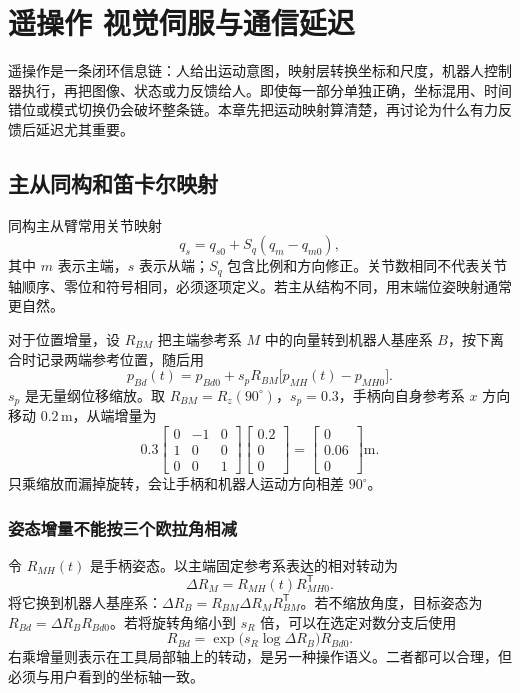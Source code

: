 \chapter{遥操作 视觉伺服与通信延迟}
\label{ch:teleoperation}

遥操作是一条闭环信息链：人给出运动意图，映射层转换坐标和尺度，机器人控制器执行，再把图像、状态或力反馈给人。即使每一部分单独正确，坐标混用、时间错位或模式切换仍会破坏整条链。本章先把运动映射算清楚，再讨论为什么有力反馈后延迟尤其重要。

\section{主从同构和笛卡尔映射}

同构主从臂常用关节映射
\begin{equation}
q_s=q_{s0}+S_q(q_m-q_{m0}),
\end{equation}
其中 $m$ 表示主端，$s$ 表示从端；$S_q$ 包含比例和方向修正。关节数相同不代表关节轴顺序、零位和符号相同，必须逐项定义。若主从结构不同，用末端位姿映射通常更自然。

对于位置增量，设 $R_{BM}$ 把主端参考系 $M$ 中的向量转到机器人基座系 $B$，按下离合时记录两端参考位置，随后用
\begin{equation}
p_{Bd}(t)=p_{Bd0}+s_pR_{BM}\big[p_{MH}(t)-p_{MH0}\big].
\end{equation}
$s_p$ 是无量纲位移缩放。取 $R_{BM}=R_z(90^\circ)$，$s_p=0.3$，手柄向自身参考系 $x$ 方向移动 $0.2\,\mathrm m$，从端增量为
\[
0.3\begin{bmatrix}0&-1&0\\1&0&0\\0&0&1\end{bmatrix}
\begin{bmatrix}0.2\\0\\0\end{bmatrix}
=\begin{bmatrix}0\\0.06\\0\end{bmatrix}\mathrm m.
\]
只乘缩放而漏掉旋转，会让手柄和机器人运动方向相差 $90^\circ$。

\subsection{姿态增量不能按三个欧拉角相减}

令 $R_{MH}(t)$ 是手柄姿态。以主端固定参考系表达的相对转动为
\begin{equation}
\Delta R_M=R_{MH}(t)R_{MH0}^{\mathsf T}.
\end{equation}
将它换到机器人基座系：$\Delta R_B=R_{BM}\Delta R_MR_{BM}^{\mathsf T}$。若不缩放角度，目标姿态为 $R_{Bd}=\Delta R_BR_{Bd0}$。若将旋转角缩小到 $s_R$ 倍，可以在选定对数分支后使用
\begin{equation}
R_{Bd}=\exp\!\big(s_R\log\Delta R_B\big)R_{Bd0}.
\end{equation}
右乘增量则表示在工具局部轴上的转动，是另一种操作语义。二者都可以合理，但必须与用户看到的坐标轴一致。

